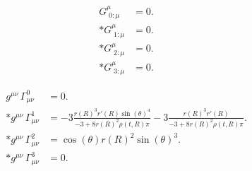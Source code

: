\documentclass[fleqn,portrait]{article}
\begin{document}
\begin{align*}
G^\mu_{\;0:\mu} & = 0. \\*
G^\mu_{\;1:\mu} & = 0. \\*
G^\mu_{\;2:\mu} & = 0. \\*
G^\mu_{\;3:\mu} & = 0.
\end{align*}

\begin{align*}
g^{\mu \nu}\,\Gamma^0_{\mu \nu} & = 0. \\*
g^{\mu \nu}\,\Gamma^1_{\mu \nu} & = -3 \frac{ r(R)^{3} r'(R) \sin(\theta)^{4}}{-3+8  r(R)^{2} \rho(t,R) \pi}-3 \frac{ r(R)^{3} r'(R)}{-3+8  r(R)^{2} \rho(t,R) \pi}. \\*
g^{\mu \nu}\,\Gamma^2_{\mu \nu} & =  \cos(\theta) r(R)^{2} \sin(\theta)^{3}. \\*
g^{\mu \nu}\,\Gamma^3_{\mu \nu} & = 0.
\end{align*}
\end{document}
